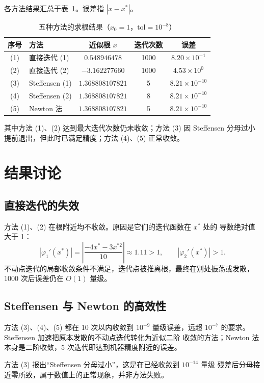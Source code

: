 \documentclass[UTF8]{ctexart}
\begin{document}
各方法结果汇总于表~\ref{tab:res}。误差指 $|x-x^*|$。

\begin{table}[H]
\centering
\small
\caption{五种方法的求根结果（$x_0=1$，$\text{tol}=10^{-8}$）}
\label{tab:res}
\begin{tabular}{clccc}
\toprule
序号 & 方法 & 近似根 $x$ & 迭代次数 & 误差 \\
\midrule
(1) & 直接迭代 (1) & $0.548946478$ & 1000 & $8.20\times10^{-1}$ \\
(2) & 直接迭代 (2) & $-3.162277660$ & 1000 & $4.53\times10^{0}$ \\
(3) & Steffensen (1) & $1.368808107821$ & 5 & $8.21\times10^{-10}$ \\
(4) & Steffensen (2) & $1.368808107821$ & 8 & $8.21\times10^{-10}$ \\
(5) & Newton 法 & $1.368808107821$ & 5 & $8.21\times10^{-10}$ \\
\bottomrule
\end{tabular}
\end{table}

其中方法 (1)、(2) 达到最大迭代次数仍未收敛；方法 (3) 因 Steffensen
分母过小提前退出，但此时已满足精度；方法 (4)、(5) 正常收敛。

\section{结果讨论}

\subsection{直接迭代的失效}

方法 (1)、(2) 在根附近均不收敛。原因是它们的迭代函数在 $x^*$ 处的
导数绝对值大于 1：
\[
|\varphi_1'(x^*)|=\left|\frac{-4x^*-3x^{*2}}{10}\right|\approx 1.11>1,
\qquad
|\varphi_2'(x^*)|>1.
\]
不动点迭代的局部收敛条件不满足，迭代点被推离根，最终在别处振荡或发散，
1000 次后误差仍在 $O(1)$ 量级。

\subsection{Steffensen 与 Newton 的高效性}

方法 (3)、(4)、(5) 都在 10 次以内收敛到 $10^{-9}$ 量级误差，远超
$10^{-7}$ 的要求。Steffensen 加速把原本发散的不动点迭代转化为近似二阶
收敛的方法；Newton 法本身是二阶收敛，5 次迭代即达到机器精度附近的误差。

方法 (3) 报出“Steffensen 分母过小”，这是在已经收敛到 $10^{-14}$ 量级
残差后分母接近零所致，属于数值上的正常现象，并非方法失败。
\end{document}
